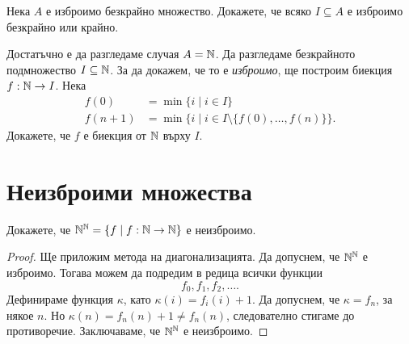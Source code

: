 \begin{problem}
  Нека $A$ е изброимо безкрайно множество.
  Докажете, че всяко $I \subseteq A$ е изброимо безкрайно или крайно.
\end{problem}
\begin{hint}
  Достатъчно е да разгледаме случая $A = \mathbb{N}$.
  Да разгледаме безкрайното подмножество $I \subseteq \mathbb{N}$.
  За да докажем, че то е {\em изброимо}, ще построим биекция $f:\mathbb{N} \to I$.
  Нека
  \begin{align*}
    f(0)   & = \min\{i \mid i \in I\}\\
    f(n+1) &= \min\{i \mid i \in I \setminus\{f(0),\dots,f(n)\}\}.
  \end{align*}
  Докажете, че $f$ е биекция от $\mathbb{N}$ върху $I$.
\end{hint}

\section{Неизброими множества}

\begin{problem}
  Докажете, че $\mathbb{N}^{\mathbb{N}} = \{f \mid f:\mathbb{N} \to \mathbb{N}\}$ е неизброимо.
\end{problem}
\begin{proof}
  Ще приложим метода на диагонализацията. 
  Да допуснем, че $\mathbb{N}^{\mathbb{N}}$ е изброимо.
  Тогава можем да подредим в редица всички функции \[f_0,f_1,f_2,\dots.\]
  Дефинираме функция $\kappa$, като $\kappa(i) = f_i(i)+1$.
  Да допуснем, че $\kappa = f_n$, за някое $n$.
  Но $\kappa(n) = f_n(n)+1 \neq f_n(n)$, следователно стигаме до противоречие.
  Заключаваме, че $\mathbb{N}^{\mathbb{N}}$ е неизброимо.
\end{proof}

